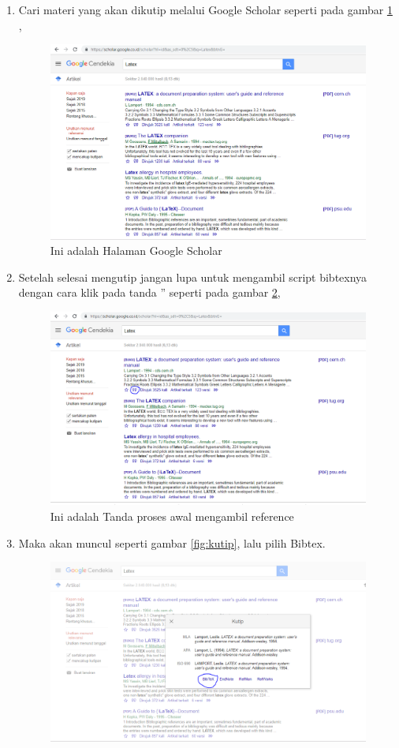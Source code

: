 \begin{enumerate}
  \item Cari materi yang akan dikutip melalui Google Scholar seperti pada gambar \ref{fig:scholar} ,
  \begin{figure}[!htbp]
  \centering
  \includegraphics[width=.75\textwidth]{figures/scholar.png}
  \caption{Ini adalah Halaman Google Scholar}\label{fig:scholar}
\end{figure}
  \item Setelah selesai mengutip jangan lupa untuk mengambil script bibtexnya dengan cara klik pada tanda '' seperti pada gambar \ref{fig:awalbibtex},
  \begin{figure}[!htbp]
  \centering
  \includegraphics[width=.75\textwidth]{figures/awalbibtex.png}
  \caption{Ini adalah Tanda proses awal mengambil reference}\label{fig:awalbibtex}
\end{figure}
  \item Maka akan muncul seperti gambar \ref{fig:kutip}, lalu pilih Bibtex.
  \begin{figure}[!htbp]
  \centering
  \includegraphics[width=.75\textwidth]{figures/kutip.png}

\end{figure}
\end{enumerate}
